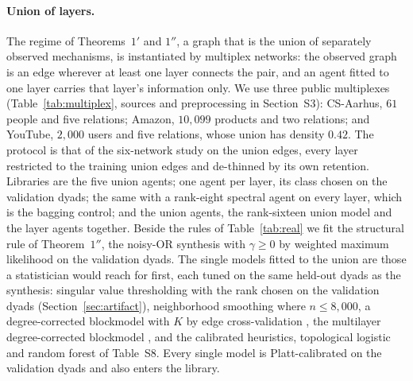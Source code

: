 \documentclass[12pt]{article}
\begin{document}
\paragraph{Union of layers.}
The regime of Theorems~$1'$ and $1''$, a graph that is the union of separately observed mechanisms, is instantiated by multiplex networks: the observed graph is an edge wherever at least one layer connects the pair, and an agent fitted to one layer carries that layer's information only. We use three public multiplexes (Table~\ref{tab:multiplex}, sources and preprocessing in Section~S3): CS-Aarhus, $61$ people and five relations; Amazon, $10{,}099$ products and two relations; and YouTube, $2{,}000$ users and five relations, whose union has density $0.42$. The protocol is that of the six-network study on the union edges, every layer restricted to the training union edges and de-thinned by its own retention. Libraries are the five union agents; one agent per layer, its class chosen on the validation dyads; the same with a rank-eight spectral agent on every layer, which is the bagging control; and the union agents, the rank-sixteen union model and the layer agents together. Beside the rules of Table~\ref{tab:real} we fit the structural rule of Theorem~$1''$, the noisy-OR synthesis with $\gamma\ge0$ by weighted maximum likelihood on the validation dyads. The single models fitted to the union are those a statistician would reach for first, each tuned on the same held-out dyads as the synthesis: singular value thresholding \citep{Chatterjee2015} with the rank chosen on the validation dyads (Section~\ref{sec:artifact}), neighborhood smoothing \citep{ZhangLevinaZhu2017} where $n\le8{,}000$, a degree-corrected blockmodel \citep{KarrerNewman2011} with $K$ by edge cross-validation \citep{LiLevinaZhu2020}, the multilayer degree-corrected blockmodel \citep{HanXuAiroldi2015, PaulChen2020}, and the calibrated heuristics, topological logistic and random forest of Table~S8. Every single model is Platt-calibrated on the validation dyads and also enters the library.
\end{document}
